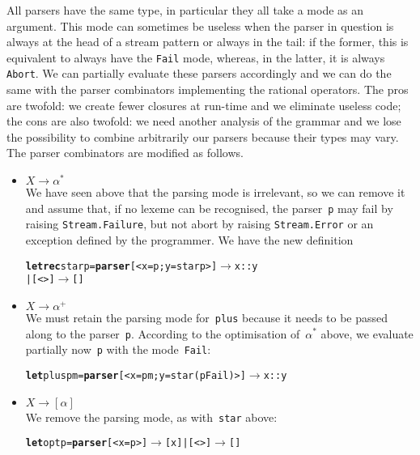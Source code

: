All parsers have the same type, in particular they all take a mode as
an argument. This mode can sometimes be useless when the parser in
question is always at the head of a stream pattern or always in the
tail: if the former, this is equivalent to always have the
\texttt{Fail} mode, whereas, in the latter, it is always
\texttt{Abort}. We can partially evaluate these parsers accordingly
and we can do the same with the parser combinators implementing the
rational operators. The pros are twofold: we create fewer closures at
run\hyp{}time and we eliminate useless code; the cons are also
twofold: we need another analysis of the grammar and we lose the
possibility to combine arbitrarily our parsers because their types may
vary. The parser combinators are modified as follows.
\begin{itemize}

  \item \(X \rightarrow \alpha^*\)\\ We have seen above that the
    parsing mode is irrelevant, so we can remove it and assume that,
    if no lexeme can be recognised, the parser~\texttt{p} may fail by
    raising \texttt{Stream.Failure}, but not abort by raising
    \texttt{Stream.Error} or an exception defined by the
    programmer. We have the new definition
\begin{alltt}
\textbf{let rec} star p = \textbf{parser} [< x=p; y=star p >] \(\rightarrow\) x::y
                      |                [<>] \(\rightarrow\) []
\end{alltt}

  \item \(X \rightarrow \alpha^+\)\\ We must retain the parsing mode
    for~\texttt{plus} because it needs to be passed along to the
    parser~\texttt{p}. According to the optimisation of~\(\alpha^*\)
    above, we evaluate partially now~\texttt{p} with the
    mode~\texttt{Fail}:
\begin{alltt}
\textbf{let} plus p m = \textbf{parser} [< x=p m; y=star (p Fail) >] \(\rightarrow\) x::y
\end{alltt}

  \item \(X \rightarrow [\alpha]\)\\
    We remove the parsing mode, as with~\texttt{star} above:
\begin{alltt}
\textbf{let} opt p = \textbf{parser} [< x=p >] \(\rightarrow\) [x] | [<>] \(\rightarrow\) []
\end{alltt}


\end{itemize}

